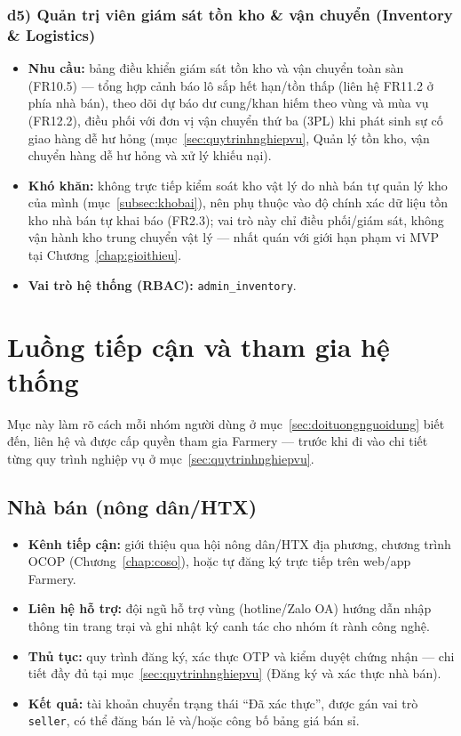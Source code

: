 \subsubsection*{d5) Quản trị viên giám sát tồn kho \& vận chuyển (Inventory \& Logistics)}
\begin{itemize}
    \item \textbf{Nhu cầu:} bảng điều khiển giám sát tồn kho và vận chuyển toàn sàn (FR10.5) --- tổng hợp cảnh báo lô sắp hết hạn/tồn thấp (liên hệ FR11.2 ở phía nhà bán), theo dõi dự báo dư cung/khan hiếm theo vùng và mùa vụ (FR12.2), điều phối với đơn vị vận chuyển thứ ba (3PL) khi phát sinh sự cố giao hàng dễ hư hỏng (mục~\ref{sec:quytrinhnghiepvu}, Quản lý tồn kho, vận chuyển hàng dễ hư hỏng và xử lý khiếu nại).
    \item \textbf{Khó khăn:} không trực tiếp kiểm soát kho vật lý do nhà bán tự quản lý kho của mình (mục~\ref{subsec:khobai}), nên phụ thuộc vào độ chính xác dữ liệu tồn kho nhà bán tự khai báo (FR2.3); vai trò này chỉ điều phối/giám sát, không vận hành kho trung chuyển vật lý --- nhất quán với giới hạn phạm vi MVP tại Chương~\ref{chap:gioithieu}.
    \item \textbf{Vai trò hệ thống (RBAC):} \texttt{admin\_inventory}.
\end{itemize}

\section{Luồng tiếp cận và tham gia hệ thống}
\label{sec:luongtiepcan}

Mục này làm rõ cách mỗi nhóm người dùng ở mục~\ref{sec:doituongnguoidung} biết đến, liên hệ và được cấp quyền tham gia Farmery — trước khi đi vào chi tiết từng quy trình nghiệp vụ ở mục~\ref{sec:quytrinhnghiepvu}.

\subsection*{Nhà bán (nông dân/HTX)}
\begin{itemize}
    \item \textbf{Kênh tiếp cận:} giới thiệu qua hội nông dân/HTX địa phương, chương trình OCOP (Chương~\ref{chap:coso}), hoặc tự đăng ký trực tiếp trên web/app Farmery.
    \item \textbf{Liên hệ hỗ trợ:} đội ngũ hỗ trợ vùng (hotline/Zalo OA) hướng dẫn nhập thông tin trang trại và ghi nhật ký canh tác cho nhóm ít rành công nghệ.
    \item \textbf{Thủ tục:} quy trình đăng ký, xác thực OTP và kiểm duyệt chứng nhận — chi tiết đầy đủ tại mục~\ref{sec:quytrinhnghiepvu} (Đăng ký và xác thực nhà bán).
    \item \textbf{Kết quả:} tài khoản chuyển trạng thái ``Đã xác thực'', được gán vai trò \texttt{seller}, có thể đăng bán lẻ và/hoặc công bố bảng giá bán sỉ.
\end{itemize}

